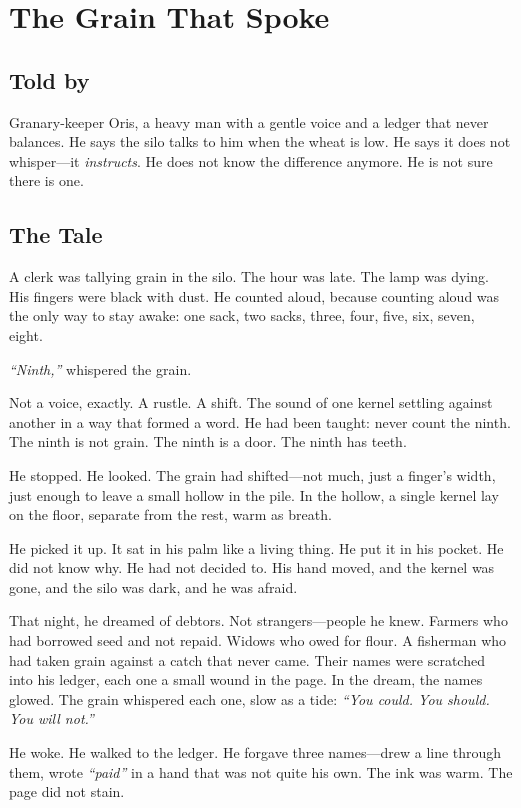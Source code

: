 \chapter{The Grain That Spoke}

\section*{Told by}
Granary-keeper Oris, a heavy man with a gentle voice and a ledger that never balances. He says the silo talks to him when the wheat is low. He says it does not whisper—it \textit{instructs}. He does not know the difference anymore. He is not sure there is one.

\section*{The Tale}

A clerk was tallying grain in the silo. The hour was late. The lamp was dying. His fingers were black with dust. He counted aloud, because counting aloud was the only way to stay awake: one sack, two sacks, three, four, five, six, seven, eight.

\textit{``Ninth,''}{} whispered the grain.

Not a voice, exactly. A rustle. A shift. The sound of one kernel settling against another in a way that formed a word. He had been taught: never count the ninth. The ninth is not grain. The ninth is a door. The ninth has teeth.

He stopped. He looked. The grain had shifted—not much, just a finger's width, just enough to leave a small hollow in the pile. In the hollow, a single kernel lay on the floor, separate from the rest, warm as breath.

He picked it up. It sat in his palm like a living thing. He put it in his pocket. He did not know why. He had not decided to. His hand moved, and the kernel was gone, and the silo was dark, and he was afraid.

That night, he dreamed of debtors. Not strangers—people he knew. Farmers who had borrowed seed and not repaid. Widows who owed for flour. A fisherman who had taken grain against a catch that never came. Their names were scratched into his ledger, each one a small wound in the page. In the dream, the names glowed. The grain whispered each one, slow as a tide: \textit{``You could. You should. You will not.''}

He woke. He walked to the ledger. He forgave three names—drew a line through them, wrote \textit{``paid''}{} in a hand that was not quite his own. The ink was warm. The page did not stain.

